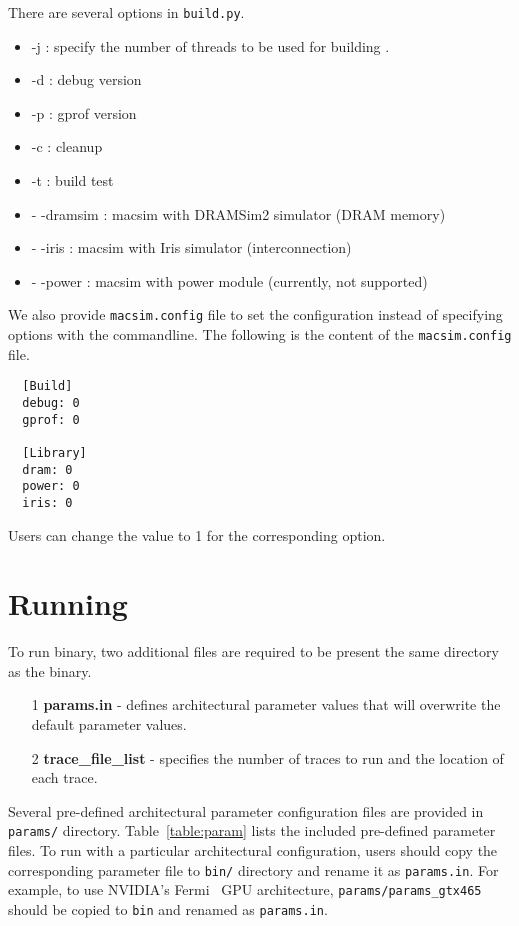 There are several options in \Verb+build.py+.

\begin{itemize}
  \item -j : specify the number of threads to be used for building \SIM.
  \item -d : debug version
  \item -p : gprof version
  \item -c : cleanup
  \item -t : build test
  \item - -dramsim : macsim with DRAMSim2 simulator (DRAM memory) 
  \item - -iris : macsim with Iris simulator (interconnection)
  \item - -power : macsim with power module (currently, not supported)
\end{itemize}

\noindent
We also provide \Verb+macsim.config+ file to set the configuration instead of 
specifying options with the commandline. The following is the content of the 
\Verb+macsim.config+ file.

  \begin{Verbatim}
  [Build]
  debug: 0
  gprof: 0

  [Library]
  dram: 0
  power: 0
  iris: 0
  \end{Verbatim}

\noindent
Users can change the value to 1 for the corresponding option.

\section{Running \SIM}
\label{sec:run}

To run \bin binary, two additional files are required to be present 
the same directory as the binary.

\begin{itemize}
  \item[1] \textbf{params.in} - defines architectural parameter values that will
  overwrite the default parameter values.

  \item[2] \textbf{trace\_file\_list} - specifies the number of traces to run and
  the location of each trace.
\end{itemize}


Several pre-defined architectural parameter configuration files are provided in
\Verb+params/+ directory. Table~\ref{table:param} lists the included
pre-defined parameter files. To run \SIM with a particular architectural
configuration, users should copy the corresponding parameter file to \Verb+bin/+
directory and rename it as \Verb+params.in+. For example, to use NVIDIA's
Fermi~\cite{fermi} GPU architecture, \Verb+params/params_gtx465+ should be
copied to \Verb+bin+ and renamed as \Verb+params.in+. 

